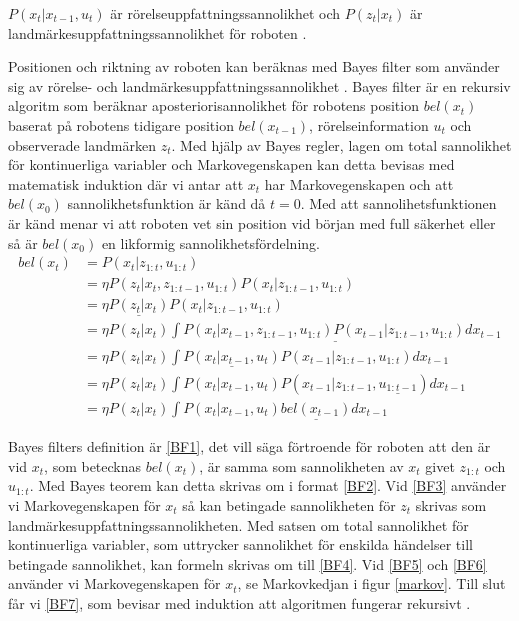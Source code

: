 $P(x_t|x_{t-1}, u_{t})$ är rörelseuppfattningssannolikhet och $P(z_t|x_t)$ är landmärkesuppfattningssannolikhet för roboten \citep{ProbabilisticRobotics}. 

Positionen och riktning av roboten kan beräknas med Bayes filter som använder sig av rörelse- och landmärkesuppfattningssannolikhet \citep{ProbabilisticRobotics}. Bayes filter är en rekursiv algoritm som beräknar aposteriorisannolikhet för robotens position $bel(x_t)$ baserat på robotens tidigare position $bel(x_{t-1})$, rörelseinformation $u_t$ och observerade landmärken $z_t$. Med hjälp av Bayes regler, lagen om total sannolikhet för kontinuerliga variabler och Markovegenskapen kan detta bevisas med matematisk induktion där vi antar att $x_t$ har Markovegenskapen och att $bel(x_0)$ sannolikhetsfunktion är känd då $t = 0$. Med att sannolihetsfunktionen är känd menar vi att roboten vet sin position vid början med full säkerhet eller så är $bel(x_0)$ en likformig sannolikhetsfördelning.
\begin{align}
bel(x_t) & = P(x_t | z_{1:t}, u_{1:t}) \tag{BF1}\label{BF1} \\
        & = \eta P(z_t | x_t, z_{1:t-1}, u_{1:t}) P(x_t | z_{1:t-1}, u_{1:t}) \tag{BF2}\label{BF2}\\
        & = \eta \underline{P(z_t | x_t)} P(x_t | z_{1:t-1}, u_{1:t}) \tag{BF3}\label{BF3}\\
        & = \eta P(z_t | x_t) \underline{\int P(x_t | x_{t-1}, z_{1:t-1}, u_{1:t}) P(x_{t-1} | z_{1:t-1}, u_{1:t}) dx_{t-1}} \tag{BF4}\label{BF4}\\
        & = \eta P(z_t | x_t) \int \underline{P(x_t | x_{t-1}, u_t)} P(x_{t-1} | z_{1:t-1}, u_{1:t}) dx_{t-1} \tag{BF5}\label{BF5}\\
        & = \eta P(z_t | x_t) \int P(x_t | x_{t-1}, u_t) P(x_{t-1} | z_{1:t-1}, \underline{u_{1:t-1}}) dx_{t-1} \tag{BF6}\label{BF6}\\
        & = \eta P(z_t | x_t) \int P(x_t | x_{t-1}, u_t) \underline{bel(x_{t-1})} dx_{t-1} \tag{BF7}\label{BF7}
\end{align}

Bayes filters definition är \ref{BF1}, det vill säga förtroende för roboten att den är vid $x_t$, som betecknas $bel(x_t)$, är samma som sannolikheten av $x_t$ givet $z_{1:t}$ och $u_{1:t}$. Med Bayes teorem kan detta skrivas om i format \ref{BF2}. Vid \ref{BF3} använder vi Markovegenskapen för $x_t$ så kan betingade sannolikheten för $z_t$ skrivas som landmärkesuppfattningssannolikheten. Med satsen om total sannolikhet för kontinuerliga variabler, som uttrycker sannolikhet för enskilda händelser till betingade sannolikhet, kan formeln skrivas om till \ref{BF4}. Vid \ref{BF5} och \ref{BF6} använder vi Markovegenskapen för $x_t$, se Markovkedjan i figur \ref{markov}. Till slut får vi \ref{BF7}, som bevisar med induktion att algoritmen fungerar rekursivt \citep{ProbabilisticRobotics}.

